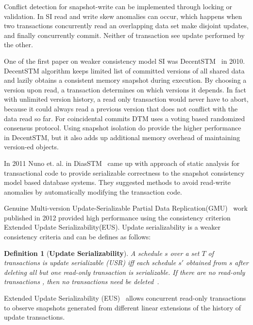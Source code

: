 \documentclass[12pt,english]{report}
\newtheorem{definition}{Definition}[section]
\begin{document}
Conflict detection for snapshot-write can be implemented through locking or validation. In SI read and write skew anomalies can occur, which happens when two transactions concurrently read an overlapping data set make disjoint updates, and finally concurrently commit. Neither of transaction see update performed by the other.

One of the first paper on weaker consistency model SI was DecentSTM~\cite{DecentSTM:5470446} in 2010.  DecentSTM algorithm keeps limited list of committed versions of all shared data and lazily obtains a consistent memory snapshot during execution. By choosing a version upon read, a transaction determines on which versions it depends. In fact with unlimited version history, a read only transaction would never have to abort, because it could always read a previous version that does not conflict with the data read so far. For coincidental commits DTM uses a voting based randomized consensus protocol. Using snapshot isolation do provide the higher performance in DecentSTM, but it also adds up additional memory overhead of maintaining version-ed objects.  

In 2011 Nuno et. al. in DiasSTM~\cite{dias2011efficient} came up with approach of static analysis for transactional code to provide serializable correctness to the snapshot consistency model based database systems. They suggested methods to avoid read-write anomalies by automatically modifying the transaction code.

Genuine Multi-version Update-Serializable Partial Data Replication(GMU)~\cite{GMU:peluso2012scalability} work published in 2012 provided high performance using the consistency criterion Extended Update Serializability(EUS). Update serializability is a weaker consistency criteria and can be defines as follows:

\begin{definition}[\textbf{Update Serializability}]
A schedule $s$ over a set $T$ of transactions is update serializable (USR) iff each schedule $s'$ obtained from $s$ after deleting all but one read-only transaction is serializable. If there are no read-only transactions , then no transactions need be deleted~\cite{UpdateSerializability1986}.
\end{definition}

Extended Update Serializability (EUS)~\cite{EUS:HansdahPatnaik} allows concurrent read-only transactions to observe snapshots generated from different linear extensions of the history of update transactions.
\end{document}
